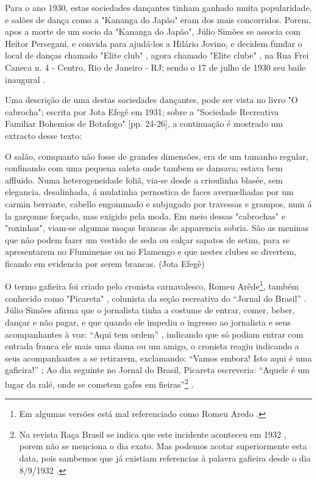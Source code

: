 Para o ano 1930, estas sociedades dançantes tinham ganhado muita popularidade, e salões de dança como a
"Kananga do Japão" eram dos mais concorridos. Porem,
apos a morte de um socio da "Kananga do Japão", 
Júlio Simões se associa com Heitor Persegani, e convida para ajudá-los a Hilário Jovino, 
e decidem fundar o local de danças chamado "Elite club" \cite[pp. 11]{eliteinaugura},
agora chamado "Elite clube" \cite[pp. 3]{juliosimoes},
na Rua Frei Caneca n. 4 - Centro, Rio de Janeiro - RJ;
sendo o 17 de julho de 1930 seu baile inaugural 
\cite[pp. 11]{eliteinaugura} \cite[pp. 3]{juliosimoes} \cite[pp. 10]{simoesjournalbrasil1}.

Uma descrição de uma destas sociedades dançantes, pode ser vista no livro "O cabrocha"; 
escrita  por Jota Efegê em 1931; 
sobre a "Sociedade Recreativa Familiar Bohemios de Botafogo" [pp. 24-26]\cite{jotaefege},
a continuação é mostrado um extracto desse texto:
\begin{tcolorbox}[breakable,colback=lowgray,colframe=lowgray]%
O salão, comquanto não fosse de grandes dimensões, era
de um tamanho regular, confinando com uma pequena saleta
onde tambem se dansava; estava bem affluido. Numa
heterogeneidade foliã, via-se desde a crioulinha blasée, sem
elegancia, desalinhada, á mulatinha pernostica de faces
avermelhadas por um carmin berrante, cabello engommado e
subjugado por travessas e grampos, num á la garçonne
forçado, mas exigido pela moda. Em meio dessas "cabrochas"
e "roxinhas", viam-se algumas moças brancas de apparencia
sobria. São as meninas que não podem fazer um vestido de
seda ou calçar sapatos de setim, para se apresentarem no
Fluminense ou no Flamengo e que nestes clubes se divertem,
ficando em evidencia por serem brancas.  %
(Jota Efegê)
\end{tcolorbox}



O termo gafieira foi criado pelo cronista carnavalesco, 
Romeu Arêde\footnote{Em algumas versões está mal referenciado como Romeu Aredo \cite[pp. 188]{raca1999}.}, 
também conhecido como "Picareta" \cite[pp. 3]{juliosimoes} \cite[pp. 21]{efege1974maxixe} \cite[pp. 78]{coutinho2006cronistas}, 
colunista da seção recreativa do ``Jornal do Brasil'' \cite[pp. 18]{entrevistajuliojournalbrasil1}.
Júlio Simões afirma que o jornalista tinha a costume de entrar, comer, beber, dançar e não pagar,
e que quando ele impediu o ingresso ao jornalista e seus acompanhantes à voz: ``Aqui tem ordem'' \cite[pp.13 ]{respeitojournalbrasil1},
indicando que só podiam entrar com entrada franca ele mais uma dama ou um amigo,
o cronista reagiu indicando a seus acompanhantes a se retirarem, exclamando: 
``Vamos embora! Isto aqui é uma gafieira!'' \cite[pp. 29]{instituto1987revista};
Ao dia seguinte no Jornal do Brasil, Picareta escreveria:
``Aquele é um lugar da ralé, onde se cometem gafes em fieiras''\footnote{Na 
revista Raça Brasil se indica que este incidente aconteceu em 1932 \cite[pp. 188]{raca1999}, 
porem não se menciona o dia exato. 
Mas podemos acotar superiormente esta data, 
pois sambemos que já existiam referencias à palavra gafieira desde o dia 8/9/1932 \cite[pp. 12]{gafieirajournaloradical1}.} 
\cite[pp. 188]{raca1999}.


